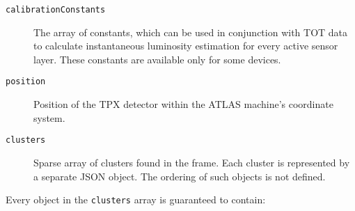 \begin{description}
	\item[\texttt{calibrationConstants}]
	The array of constants, which can be used in conjunction with TOT data to calculate instantaneous luminosity estimation for every active sensor layer. These constants are available only for some devices.

	\item[\texttt{position}]
	Position of the TPX detector within the ATLAS machine's coordinate system.

	\item[\texttt{clusters}]
	Sparse array of clusters found in the frame. Each cluster is represented by a separate JSON object. The ordering of such objects is not defined.
\end{description}

Every object in the \texttt{clusters} array is guaranteed to contain:
~
